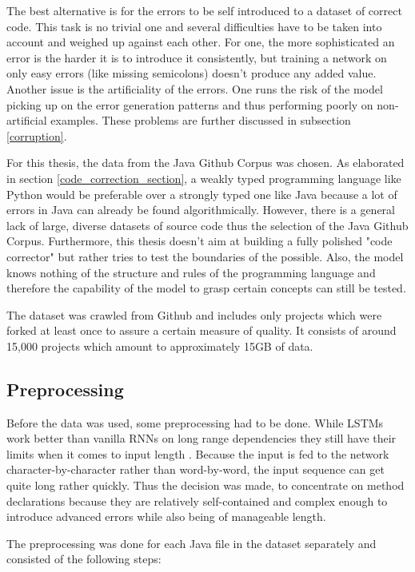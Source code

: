 The best alternative is for the errors to be self introduced to a dataset of correct code. This task is no trivial one and several difficulties have to be taken into account and weighed up against each other. For one, the more sophisticated an error is the harder it is to introduce it consistently, but training a network on only easy errors (like missing semicolons) doesn't produce any added value. Another issue is the artificiality of the errors. One runs the risk of the model picking up on the error generation patterns and thus performing poorly on non-artificial examples. These problems are further discussed in subsection \ref{corruption}.

For this thesis, the data from the Java Github Corpus \cite{java_dataset} was chosen. As elaborated in section \ref{code_correction_section}, a weakly typed programming language like Python would be preferable over a strongly typed one like Java because a lot of errors in Java can already be found algorithmically. However, there is a general lack of large, diverse datasets of source code thus the selection of the Java Github Corpus. Furthermore, this thesis doesn't aim at building a fully polished "code corrector" but rather tries to test the boundaries of the possible. Also, the model knows nothing of the structure and rules of the programming language and therefore the capability of the model to grasp certain concepts can still be tested.

The dataset was crawled from Github and includes only projects which were forked at least once to assure a certain measure of quality. It consists of around 15,000 projects which amount to approximately 15GB of data.

\subsection{Preprocessing}

Before the data was used, some preprocessing had to be done. While LSTMs work better than vanilla RNNs on long range dependencies they still have their limits when it comes to input length \cite{timestep_limitation}. Because the input is fed to the network character-by-character rather than word-by-word, the input sequence can get quite long rather quickly. Thus the decision was made, to concentrate on method declarations because they are relatively self-contained and complex enough to introduce advanced errors while also being of manageable length.

The preprocessing was done for each Java file in the dataset separately and consisted of the following steps:

